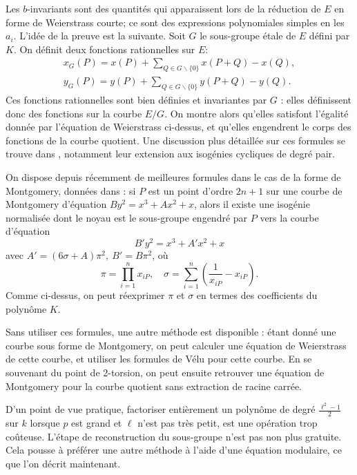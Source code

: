 \documentclass[11pt,a4paper]{article}
\renewcommand{\v}{\vspace{5mm}}
\theoremstyle{definition}
\begin{document}
Les $b$-invariants sont des quantités qui apparaissent lors de la réduction de $E$ en forme de Weierstrass courte; ce sont des expressions polynomiales simples en les $a_i$. L'idée de la preuve est la suivante.
Soit $G$ le sous-groupe étale de $E$ défini par $K$. On définit deux fonctions rationnelles sur $E$:
$$\begin{aligned}
x_G(P) = x(P) + \sum_{Q\in G\backslash \{0\}} x(P+Q) - x(Q),\\
y_G(P) = y(P) + \sum_{Q\in G\backslash \{0\}} y(P+Q) - y(Q).
\end{aligned}$$
Ces fonctions rationnelles sont bien définies et invariantes par $G$ : elles définissent donc des fonctions sur la courbe $E/G$. On montre alors qu'elles satisfont l'égalité donnée par l'équation de Weierstrass ci-dessus, et qu'elles engendrent le corps des fonctions de la courbe quotient.
Une discussion plus détaillée sur ces formules se trouve dans \cite{Kohel}, notamment leur extension aux isogénies cycliques de degré pair.

\v
On dispose depuis récemment de meilleures formules dans le cas de la forme de Montgomery, données dans \cite{VeluMontgomery}: si $P$ est un point d'ordre $2n+1$ sur une courbe de Montgomery d'équation $By^2 = x^3 + Ax^2 + x$, alors il existe une isogénie normalisée dont le noyau est le sous-groupe engendré par $P$ vers la courbe d'équation
$$B'y^2 = x^3 + A'x^2 + x$$
avec $A' = (6\sigma + A)\pi^2,\ B' = B\pi^2$, où
$$
\pi = \prod_{i = 1}^n x_{iP}, \quad
\sigma = \sum_{i = 1}^n \left(\frac{1}{x_{iP}} - x_{iP}\right).
$$
Comme ci-dessus, on peut réexprimer $\pi$ et $\sigma$ en termes des coefficients du polynôme $K$.

Sans utiliser ces formules, une autre méthode est disponible : étant donné une courbe sous forme de Montgomery, on peut calculer une équation de Weierstrass de cette courbe, et utiliser les formules de Vélu pour cette courbe. En se souvenant du point de 2-torsion, on peut ensuite retrouver une équation de Montgomery pour la courbe quotient sans extraction de racine carrée.

\v
D'un point de vue pratique, factoriser entièrement un polynôme de degré $\frac{\ell^2 - 1}{2}$ sur $k$ lorsque $p$ est grand et $\ell$ n'est pas très petit, est une opération trop coûteuse. L'étape de reconstruction du sous-groupe n'est pas non plus gratuite. %
Cela pousse à préférer une autre méthode à l'aide d'une équation modulaire, ce que l'on décrit maintenant.
\end{document}
